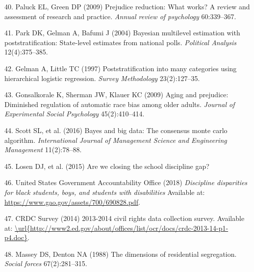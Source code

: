 \documentclass[9pt,twocolumn,twoside,lineno]{pnas-new}
\begin{document}
\hypertarget{ref-paluck2009prejudice}{}
40. Paluck EL, Green DP (2009) Prejudice reduction: What works? A review
and assessment of research and practice. \emph{Annual review of
psychology} 60:339--367.

\hypertarget{ref-park2004bayesian}{}
41. Park DK, Gelman A, Bafumi J (2004) Bayesian multilevel estimation
with poststratification: State-level estimates from national polls.
\emph{Political Analysis} 12(4):375--385.

\hypertarget{ref-gelman1997poststratification}{}
42. Gelman A, Little TC (1997) Poststratification into many categories
using hierarchical logistic regression. \emph{Survey Methodology}
23(2):127--35.

\hypertarget{ref-gonsalkorale2009aging}{}
43. Gonsalkorale K, Sherman JW, Klauer KC (2009) Aging and prejudice:
Diminished regulation of automatic race bias among older adults.
\emph{Journal of Experimental Social Psychology} 45(2):410--414.

\hypertarget{ref-scott2016bayes}{}
44. Scott SL, et al. (2016) Bayes and big data: The consensus monte
carlo algorithm. \emph{International Journal of Management Science and
Engineering Management} 11(2):78--88.

\hypertarget{ref-losen2015we}{}
45. Losen DJ, et al. (2015) Are we closing the school discipline gap?

\hypertarget{ref-usgao2018discipline}{}
46. United States Government Accountability Office (2018)
\emph{Discipline disparities for black students, boys, and students with
disabilities} Available at:
\url{https://www.gao.gov/assets/700/690828.pdf}.

\hypertarget{ref-crdc2013survey}{}
47. CRDC Survey (2014) 2013-2014 civil rights data collection survey.
Available at:
\href{/url\%7Bhttp://www2.ed.gov/about/offices/list/ocr/docs/crdc-2013-14-p1-p4.doc\%7D}{\textbackslash{}url\{http://www2.ed.gov/about/offices/list/ocr/docs/crdc-2013-14-p1-p4.doc\}}.

\hypertarget{ref-massey1988dimensions}{}
48. Massey DS, Denton NA (1988) The dimensions of residential
segregation. \emph{Social forces} 67(2):281--315.



% 
\end{document}
